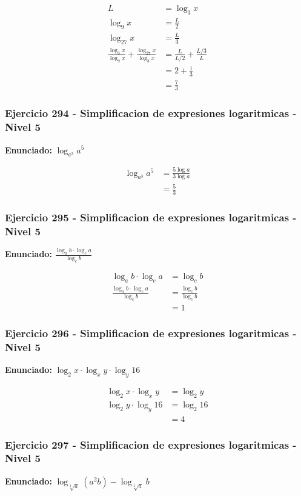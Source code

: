 \documentclass[12pt,a4paper]{article}
\begin{document}
\[
\begin{aligned}
L&=\log_3 x\\
\log_9 x&=\frac L2\\
\log_{27}x&=\frac L3\\
\frac{\log_3 x}{\log_9 x}+\frac{\log_{27}x}{\log_3 x}&=\frac{L}{L/2}+\frac{L/3}{L}\\
&=2+\frac13\\
&=\boxed{\frac73}
\end{aligned}
\]


\subsubsection*{Ejercicio 294 - Simplificacion de expresiones logaritmicas - Nivel 5}
\textbf{Enunciado:} \(\log_{a^3}a^5\)

\[
\begin{aligned}
\log_{a^3}a^5&=\frac{5\log a}{3\log a}\\
&=\boxed{\frac53}
\end{aligned}
\]


\subsubsection*{Ejercicio 295 - Simplificacion de expresiones logaritmicas - Nivel 5}
\textbf{Enunciado:} \(\frac{\log_a b\cdot\log_c a}{\log_c b}\)

\[
\begin{aligned}
\log_a b\cdot\log_c a&=\log_c b\\
\frac{\log_a b\cdot\log_c a}{\log_c b}&=\frac{\log_c b}{\log_c b}\\
&=\boxed{1}
\end{aligned}
\]


\subsubsection*{Ejercicio 296 - Simplificacion de expresiones logaritmicas - Nivel 5}
\textbf{Enunciado:} \(\log_2 x\cdot\log_x y\cdot\log_y 16\)

\[
\begin{aligned}
\log_2 x\cdot\log_x y&=\log_2 y\\
\log_2 y\cdot\log_y 16&=\log_2 16\\
&=\boxed{4}
\end{aligned}
\]


\subsubsection*{Ejercicio 297 - Simplificacion de expresiones logaritmicas - Nivel 5}
\textbf{Enunciado:} \(\log_{\sqrt[3]{a}}(a^2b)-\log_{\sqrt[3]{a}}b\)
\end{document}
